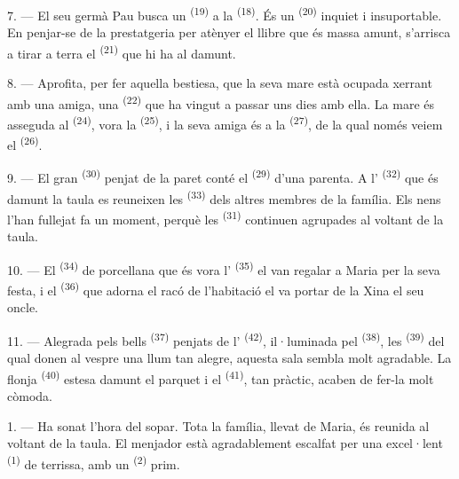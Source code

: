 \VUsaut{5.0mm}
\VUsaut{3.0mm}

7. --- El seu germà Pau busca un  \textsuperscript{(19)} a la
 \textsuperscript{(18)}. És un 
\textsuperscript{(20)} inquiet i insuportable. En penjar-se de la prestatgeria per
atènyer el llibre que és massa amunt, s'arrisca a tirar a terra el 
\textsuperscript{(21)} que hi ha al damunt.

8. --- Aprofita, per fer aquella bestiesa, que la seva mare està ocupada xerrant
amb una amiga, una  \textsuperscript{(22)} que ha vingut a passar
uns dies amb ella. La mare és asseguda al  \textsuperscript{(24)},
vora la  \textsuperscript{(25)}, i la seva amiga és a la
 \textsuperscript{(27)}, de la qual només veiem el
 \textsuperscript{(26)}.

9. --- El gran  \textsuperscript{(30)} penjat de la paret conté el
 \textsuperscript{(29)} d'una parenta. A l'
\textsuperscript{(32)} que és damunt la taula es reuneixen les 
\textsuperscript{(33)} dels altres membres de la família. Els nens l'han fullejat
fa un moment, perquè les  \textsuperscript{(31)} continuen
agrupades al voltant de la taula.

10. --- El  \textsuperscript{(34)} de porcellana que és vora
l' \textsuperscript{(35)} el van regalar a Maria per la seva
festa, i el  \textsuperscript{(36)} que adorna el racó de
l'habitació el va portar de la Xina el seu oncle.

11. --- Alegrada pels bells  \textsuperscript{(37)} penjats de
l' \textsuperscript{(42)}, il·luminada pel 
\textsuperscript{(38)}, les  \textsuperscript{(39)} del qual donen
al vespre una llum tan alegre, aquesta sala sembla molt agradable. La flonja
 \textsuperscript{(40)} estesa damunt el parquet i el
 \textsuperscript{(41)}, tan pràctic, acaben de fer-la
molt còmoda.

\VUsaut{3.6mm}
\VUsaut{3.0mm}

1. --- Ha sonat l'hora del sopar. Tota la família, llevat de Maria, és reunida al
voltant de la taula. El menjador està agradablement escalfat per una excel·lent
 \textsuperscript{(1)} de terrissa, amb un 
\textsuperscript{(2)} prim.

